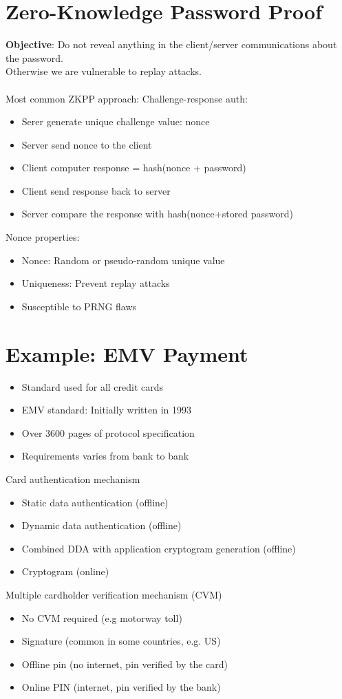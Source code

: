 \documentclass{article}[18pt]
\begin{document}
\section{Zero-Knowledge Password Proof}
\textbf{Objective}: Do not reveal anything in the client/server communications about the password.\\
Otherwise we are vulnerable to replay attacks.\\
\\
Most common ZKPP approach: Challenge-response auth:
\begin{itemize}
	\item Serer generate unique challenge value: nonce
	\item Server send nonce to the client
	\item Client computer response = hash(nonce + password)
	\item Client send response back to server
	\item Server compare the response with hash(nonce+stored password)
\end{itemize}
Nonce properties:
\begin{itemize}
	\item Nonce: Random or pseudo-random unique value
	\item Uniqueness: Prevent replay attacks
	\item Susceptible to PRNG flaws
\end{itemize}
\section{Example: EMV Payment}
\begin{itemize}
	\item Standard used for all credit cards
	\item EMV standard: Initially written in 1993
	\item Over 3600 pages of protocol specification
	\item Requirements varies from bank to bank
\end{itemize}
Card authentication mechanism
\begin{itemize}
	\item Static data authentication (offline)
	\item Dynamic data authentication (offline)
	\item Combined DDA with application cryptogram generation (offline)
	\item Cryptogram (online)
\end{itemize}
Multiple cardholder verification mechanism (CVM)
\begin{itemize}
	\item No CVM required (e.g motorway toll)
	\item Signature (common in some countries, e.g. US)
	\item Offline pin (no internet, pin verified by the card)
	\item Online PIN (internet, pin verified by the bank)
\end{itemize}
\end{document}
